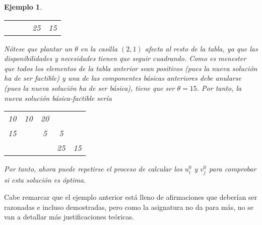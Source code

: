 \documentclass[11pt]{report}
\theoremstyle{mytheorem}
\theoremstyle{mydefinition}
\theoremstyle{myexample}
\newtheorem*{example}{Ejemplo}
\begin{document}
\begin{example}
\begin{center}
\begin{tabular}{ccccc}
    \multicolumn{1}{|c}{} & \multicolumn{1}{c}{} & \multicolumn{1}{c}{} &  \multicolumn{1}{c}{25} & \multicolumn{1}{c|}{15} \\[2pt] \cline{1-5}
\end{tabular}
\end{center}
Nótese que plantar un $\theta$ en la casilla $(2,1)$ afecta al resto de la tabla, ya que las disponibilidades y necesidades tienen que seguir cuadrando. Como es menester que todos los elementos de la tabla anterior sean positivos (pues la nueva solución ha de ser factible) y una de las componentes básicas anteriores debe anularse (pues la nueva solución ha de ser básica), tiene que ser $\theta = 15$. Por tanto, la nueva solución básica-factible sería
\begin{center}
\setlength\extrarowheight{2pt}
\begin{tabular}{ccccc}
    \cline{1-5}

    \multicolumn{1}{|c}{10} & \multicolumn{1}{c}{10} & \multicolumn{1}{c}{20} &  \multicolumn{1}{c}{} & \multicolumn{1}{c|}{} \\

    \multicolumn{1}{|c}{15} & \multicolumn{1}{c}{} & \multicolumn{1}{c}{5} &  \multicolumn{1}{c}{5} & \multicolumn{1}{c|}{} \\
    
    \multicolumn{1}{|c}{} & \multicolumn{1}{c}{} & \multicolumn{1}{c}{} &  \multicolumn{1}{c}{25} & \multicolumn{1}{c|}{15} \\[2pt] \cline{1-5}
\end{tabular}
\end{center}
Por tanto, ahora puede repetirse el proceso de calcular los $u^0_i$ y $v^0_j$ para comprobar si esta solución es óptima.
\end{example}



Cabe remarcar que el ejemplo anterior está lleno de afirmaciones que deberían ser razonadas e incluso demostradas, pero como la asignatura no da para más, no se van a detallar más justificaciones teóricas.
\end{document}

